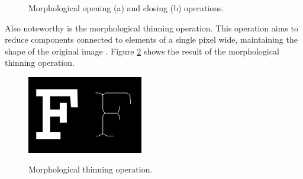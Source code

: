 \begin{figure}
  \centering
  \caption{Morphological opening (a) and closing (b) operations.}
  \hfill
  \sourceOwn
  \label{fig:cap3_morph_close_open}
\end{figure}

Also noteworthy is the morphological thinning operation.
This operation aims to reduce components connected to elements of a single pixel wide, maintaining the shape of the original image \cite{Abhishek:2017}.
Figure \ref{fig:cap3_morph_thin} shows the result of the morphological thinning operation.

\begin{figure}
  \centering
  \caption{Morphological thinning operation.}
  \includegraphics[width=0.45\textwidth]{imagens/ilustracoes/cap3_morphology_thin.png}
  \sourceOwn
  \label{fig:cap3_morph_thin}
\end{figure}

